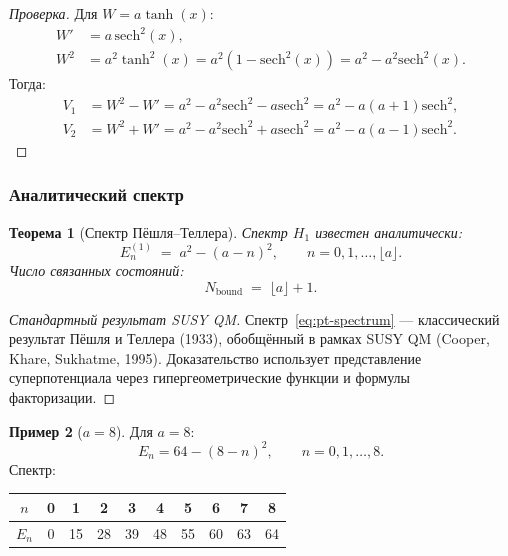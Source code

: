 \documentclass[11pt,a4paper]{article}
\newtheorem{theorem}{Теорема}[section]
\theoremstyle{definition}
\newtheorem{example}[theorem]{Пример}
\begin{document}
\begin{proof}[Проверка]
Для $W = a \tanh(x)$:
\begin{align}
    W' &= a \, \mathrm{sech}^2(x), \\
    W^2 &= a^2 \tanh^2(x) = a^2 (1 - \mathrm{sech}^2(x)) = a^2 - a^2 \mathrm{sech}^2(x).
\end{align}
Тогда:
\begin{align}
    V_1 &= W^2 - W' = a^2 - a^2 \mathrm{sech}^2 - a \mathrm{sech}^2
    = a^2 - a(a+1) \mathrm{sech}^2, \\
    V_2 &= W^2 + W' = a^2 - a^2 \mathrm{sech}^2 + a \mathrm{sech}^2
    = a^2 - a(a-1) \mathrm{sech}^2.
\end{align}
\end{proof}

\subsubsection{Аналитический спектр}

\begin{theorem}[Спектр Пёшля--Теллера]
\label{thm:pt-spectrum}
Спектр $H_1$ известен аналитически:
\begin{equation}
    \boxed{
    E_n^{(1)} \;=\; a^2 - (a - n)^2,
    \qquad n = 0, 1, \ldots, \lfloor a \rfloor.
    }
    \label{eq:pt-spectrum}
\end{equation}
Число связанных состояний:
\begin{equation}
    N_{\text{bound}} \;=\; \lfloor a \rfloor + 1.
    \label{eq:pt-bound-states}
\end{equation}
\end{theorem}

\begin{proof}[Стандартный результат SUSY QM]
Спектр~\eqref{eq:pt-spectrum} --- классический результат
Пёшля и Теллера (1933), обобщённый в рамках SUSY QM
(Cooper, Khare, Sukhatme, 1995). Доказательство использует
представление суперпотенциала через гипергеометрические
функции и формулы факторизации.
\end{proof}

\begin{example}[$a = 8$]
Для $a = 8$:
\begin{equation}
    E_n = 64 - (8 - n)^2, \qquad n = 0, 1, \ldots, 8.
\end{equation}
Спектр:
\begin{center}
\begin{tabular}{c|ccccccccc}
\toprule
$n$ & 0 & 1 & 2 & 3 & 4 & 5 & 6 & 7 & 8 \\
\midrule
$E_n$ & 0 & 15 & 28 & 39 & 48 & 55 & 60 & 63 & 64 \\
\bottomrule
\end{tabular}
\end{center}
\end{example}
\end{document}

